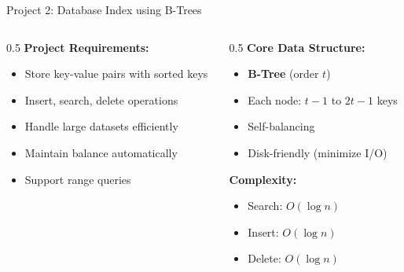 \documentclass[aspectratio=169,xcolor=dvipsnames]{beamer}
\begin{document}
\begin{frame}{Project 2: Database Index using B-Trees}
  \begin{columns}
    \begin{column}{0.5\textwidth}
      \textbf{Project Requirements:}
      \begin{itemize}
        \item Store key-value pairs with sorted keys
        \item Insert, search, delete operations
        \item Handle large datasets efficiently
        \item Maintain balance automatically
        \item Support range queries
      \end{itemize}
    \end{column}

    \begin{column}{0.5\textwidth}
      \textbf{Core Data Structure:}
      \begin{itemize}
        \item \textbf{B-Tree} (order $t$)
        \item Each node: $t-1$ to $2t-1$ keys
        \item Self-balancing
        \item Disk-friendly (minimize I/O)
      \end{itemize}

      \vspace{0.3cm}
      \textbf{Complexity:}
      \begin{itemize}
        \item Search: $O(\log n)$
        \item Insert: $O(\log n)$
        \item Delete: $O(\log n)$
      \end{itemize}
    \end{column}
  \end{columns}
\end{frame}
\end{document}
